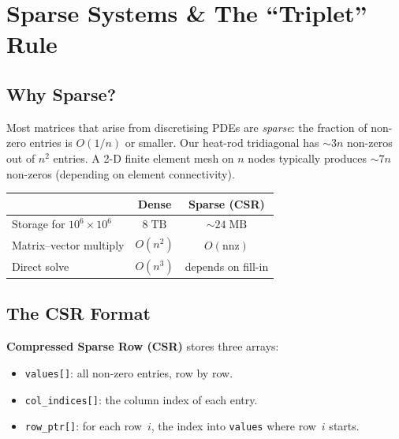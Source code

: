 \section{Sparse Systems \& The ``Triplet'' Rule}
\label{sec:sparse}

\subsection{Why Sparse?}

Most matrices that arise from discretising PDEs are \emph{sparse}: the
fraction of non-zero entries is $O(1/n)$ or smaller.  Our heat-rod
tridiagonal has $\sim 3n$ non-zeros out of $n^2$ entries.  A 2-D finite
element mesh on $n$ nodes typically produces $\sim 7n$ non-zeros
(depending on element connectivity).

\begin{center}
\renewcommand{\arraystretch}{1.3}
\begin{tabular}{@{}lcc@{}}
\toprule
& \textbf{Dense} & \textbf{Sparse (CSR)} \\
\midrule
Storage for $10^6 \times 10^6$ & $8\;\text{TB}$ & $\sim 24\;\text{MB}$ \\
Matrix--vector multiply & $O(n^2)$ & $O(\text{nnz})$ \\
Direct solve & $O(n^3)$ & depends on fill-in \\
\bottomrule
\end{tabular}
\end{center}

\subsection{The CSR Format}

\textbf{Compressed Sparse Row (CSR)} stores three arrays:
\begin{itemize}[nosep]
    \item \texttt{values[]}: all non-zero entries, row by row.
    \item \texttt{col\_indices[]}: the column index of each entry.
    \item \texttt{row\_ptr[]}: for each row~$i$, the index into
          \texttt{values} where row~$i$ starts.
\end{itemize}

